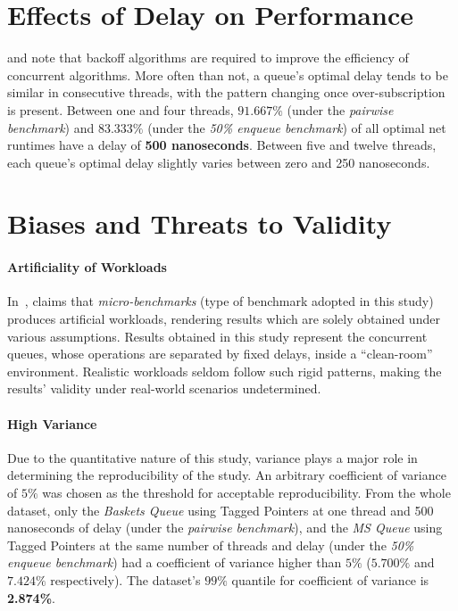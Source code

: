 \section{Effects of Delay on Performance}
\citeauthor{valois1995datastructures} and \citeauthor{hoffman2007baskets}
\citep{valois1995datastructures,hoffman2007baskets} note that backoff
algorithms are required to improve the efficiency of concurrent algorithms.
More often than not, a queue's optimal delay tends to be similar in consecutive
threads, with the pattern changing once over-subscription is present. Between
one and four threads, \textbf{$91.667\%$} (under the \emph{pairwise benchmark})
and \textbf{$83.333\%$} (under the \emph{50\% enqueue benchmark}) of all optimal net
runtimes have a delay of \textbf{500 nanoseconds}. Between five and twelve threads,
each queue's optimal delay slightly varies between zero and 250 nanoseconds. 


\section{Biases and Threats to Validity}
\paragraph{Artificiality of Workloads}
In~\citep{gregg2014systems}, \citeauthor{gregg2014systems} claims that
\emph{micro-benchmarks} (type of benchmark adopted in this study) produces
artificial workloads, rendering results which are  solely obtained under
various assumptions. Results obtained in this study represent the concurrent
queues, whose operations are separated by fixed delays, inside a ``clean-room''
environment. Realistic workloads seldom follow such rigid patterns, making the
results' validity under real-world scenarios undetermined.

\paragraph{High Variance} Due to the quantitative nature of this study,
variance plays a major role in determining the reproducibility of the study. An
arbitrary coefficient of variance of $5\%$ was chosen as the threshold for
acceptable reproducibility. From the whole dataset, only the \emph{Baskets Queue} using Tagged Pointers at
one thread and 500 nanoseconds of delay (under the \emph{pairwise benchmark}), and
the \emph{MS Queue} using Tagged Pointers at the same number of threads and
delay (under the \emph{50\% enqueue benchmark}) had a coefficient of variance
higher than $5\%$ ($5.700\%$ and $7.424\%$ respectively). The dataset's $99\%$
quantile for coefficient of variance is \textbf{2.874\%}.

